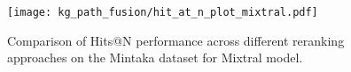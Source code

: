  \begin{figure}[htbp]
    \centering
    \texttt{[image: kg\_path\_fusion/hit\_at\_n\_plot\_mixtral.pdf]}
    \caption{Comparison of Hits@N performance across different reranking approaches on the Mintaka dataset for Mixtral model.}
    \label{fig:controllable_fusion:hit_at_n_plot_mixtral}
 \end{figure}


